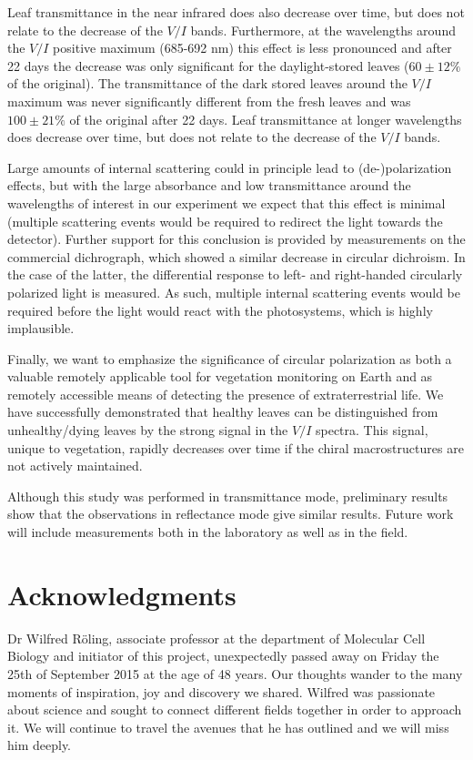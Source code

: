 \documentclass[review]{elsarticle}
\begin{document}
Leaf transmittance in the near infrared does also decrease over time, but does not relate to the decrease of the $V/I$ bands. Furthermore, at the wavelengths around the $V/I$ positive maximum (685-692 nm) this effect is less pronounced and after 22 days the decrease was only significant for the daylight-stored leaves ($60 \pm 12\%$ of the original). The transmittance of the dark stored leaves around the $V/I$ maximum was never significantly different from the fresh leaves and was $100 \pm 21 \%$ of the original after 22 days. Leaf transmittance at longer wavelengths does decrease over time, but does not relate to the decrease of the $V/I$ bands. 
 
Large amounts of internal scattering could in principle lead to (de-)polarization effects, but with the large absorbance and low transmittance around the wavelengths of interest in our experiment we expect that this effect is minimal (multiple scattering events would be required to redirect the light towards the detector). Further support for this conclusion is provided by measurements on the commercial dichrograph, which showed a similar decrease in circular dichroism. In the case of the latter, the differential response to left- and right-handed circularly polarized light is measured. As such, multiple internal scattering events would be required before the light would react with the photosystems, which is highly implausible.

Finally, we want to emphasize the significance of circular polarization as both a valuable remotely applicable tool for vegetation monitoring on Earth and as remotely accessible means of detecting the presence of extraterrestrial life. We have successfully demonstrated that healthy leaves can be distinguished from unhealthy/dying leaves by the strong signal in the $V/I$ spectra. This signal, unique to vegetation, rapidly decreases over time if the chiral macrostructures are not actively maintained. 

Although this study was performed in transmittance mode, preliminary results show that the observations in reflectance mode give similar results. Future work will include measurements both in the laboratory as well as in the field. 


\section{Acknowledgments}
Dr Wilfred R{\"o}ling, associate professor at the department of Molecular Cell Biology and initiator of this project, unexpectedly passed away on Friday the 25th of September 2015 at the age of 48 years. Our thoughts wander to the many moments of inspiration, joy and discovery we shared. Wilfred was passionate about science and sought to connect different fields together in order to approach it. We will continue to travel the avenues that he has outlined and we will miss him deeply. 
\end{document}
